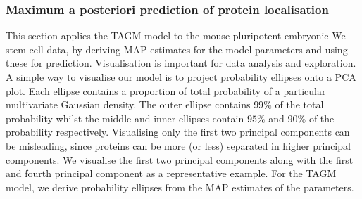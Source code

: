 \documentclass[12pt,english]{article}\usepackage[]{graphicx}\usepackage[]{color}
\begin{document}
\subsubsection{Maximum a posteriori prediction of protein localisation}

This section applies the TAGM model to the mouse pluripotent embryonic
We stem cell data, by deriving MAP estimates for the model parameters and
using these for prediction.  Visualisation is important for data
analysis and exploration. A simple way to visualise our model is to
project probability ellipses onto a PCA plot. Each ellipse contains a
proportion of total probability of a particular multivariate Gaussian
density.  The outer ellipse contains $99\%$ of the total probability
whilst the middle and inner ellipses contain $95\%$ and $90\%$ of the
probability respectively. Visualising only the first two principal
components can be misleading, since proteins can be more (or less)
separated in higher principal components.  We visualise the first two
principal components along with the first and fourth principal
component as a representative example. For the TAGM model, we derive
probability ellipses from the MAP estimates of the parameters.
\end{document}
